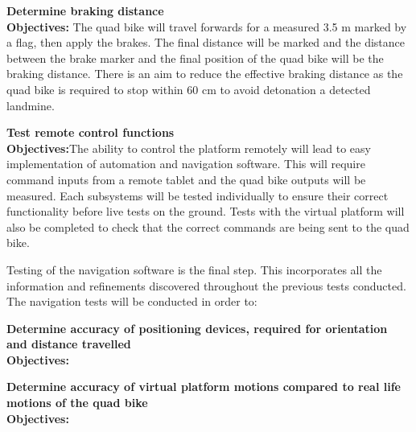 \documentclass[main.tex]{subfiles}
\begin{document}
\begin{appendices}
\begin{qb}
\end{qb}

\begin{qb}
\textbf{Determine braking distance}\\
\textbf{Objectives:} The quad bike will travel forwards for a measured 3.5 m marked by a flag, then apply the brakes. The final distance will be marked and the distance between the brake marker and the final position of the quad bike will be the braking distance. There is an aim to reduce the effective braking distance as the quad bike is required to stop within 60 cm to avoid detonation a detected landmine. 

\end{qb}
\begin{qb}
\textbf{Test remote control functions}\\
\textbf{Objectives:}The ability to control the platform remotely will lead to easy implementation of automation and navigation software. This will require command inputs from a remote tablet and the quad bike outputs will be measured. Each subsystems will be tested individually to ensure their correct functionality before live tests on the ground. Tests with the virtual platform will also be completed to check that the correct commands are being sent to the quad bike.  
\end{qb}

\medskip\noindent 
Testing of the navigation software is the final step. This incorporates all the information and refinements discovered throughout the previous tests conducted. The navigation tests will be conducted in order to:

\begin{qb}
\textbf{Determine accuracy of positioning devices, required for orientation and distance travelled}\\
\textbf{Objectives:} 
\end{qb}

\begin{qb}
\textbf{Determine accuracy of virtual platform motions compared to real life motions of the quad bike}\\
\textbf{Objectives:}
\end{qb}



\end{appendices}
\end{document}
